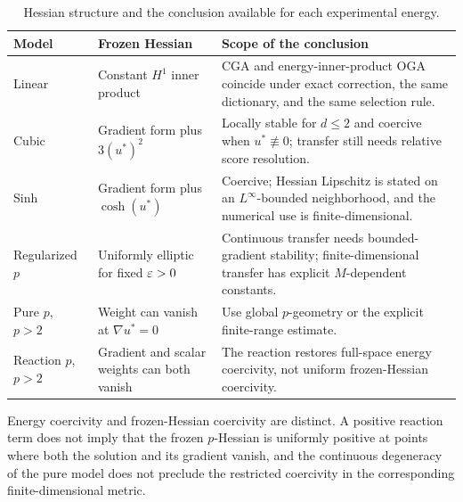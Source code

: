 \begin{table}[tbp]
\centering
\small
\caption{Hessian structure and the conclusion available for each experimental energy.}
\label{tab:model-classification}
\begin{tabularx}{\textwidth}{@{}>{\raggedright\arraybackslash}p{}>{\raggedright\arraybackslash}p{}>{\raggedright\arraybackslash}X@{}}
\toprule
Model & Frozen Hessian & Scope of the conclusion \\
\midrule
Linear & Constant \(H^1\) inner product & CGA and energy-inner-product OGA coincide under exact correction, the same dictionary, and the same selection rule. \\
Cubic & Gradient form plus \(3(u^*)^2\) & Locally stable for \(d\leq2\) and coercive when \(u^*\not\equiv0\); transfer still needs relative score resolution. \\
Sinh & Gradient form plus \(\cosh(u^*)\) & Coercive; Hessian Lipschitz is stated on an \(L^\infty\)-bounded neighborhood, and the numerical use is finite-dimensional. \\
Regularized \(p\) & Uniformly elliptic for fixed \(\varepsilon>0\) & Continuous transfer needs bounded-gradient stability; finite-dimensional transfer has explicit \(M\)-dependent constants. \\
Pure \(p\), \(p>2\) & Weight can vanish at \(\nabla u^*=0\) & Use global \(p\)-geometry or the explicit finite-range estimate. \\
Reaction \(p\), \(p>2\) & Gradient and scalar weights can both vanish & The reaction restores full-space energy coercivity, not uniform frozen-Hessian coercivity. \\
\bottomrule
\end{tabularx}
\end{table}

Energy coercivity and frozen-Hessian coercivity are distinct. A positive reaction term does
not imply that the frozen \(p\)-Hessian is uniformly positive at points where both the solution and its
gradient vanish, and the continuous degeneracy of the pure model does not preclude the restricted
coercivity in the corresponding finite-dimensional metric.
